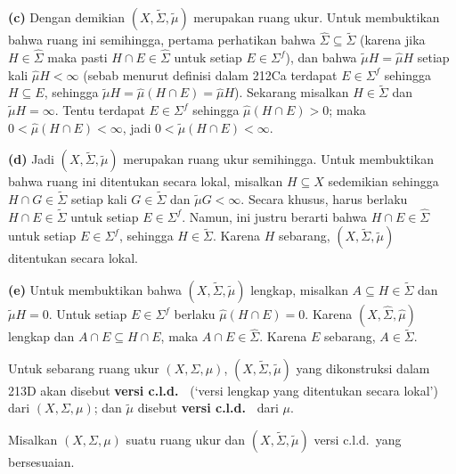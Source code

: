{\medskip

{\bf (c)} Dengan demikian $(X,\tilde\Sigma,\tilde\mu)$ merupakan ruang
ukur.   Untuk membuktikan bahwa ruang ini semihingga, pertama perhatikan bahwa
$\hat\Sigma\subseteq\tilde\Sigma$ (karena jika $H\in\hat\Sigma$ maka
pasti $H\cap E\in\hat\Sigma$ untuk setiap $E\in\Sigma^f$), dan bahwa
$\tilde\mu H=\hat\mu H$ setiap kali $\hat\mu H<\infty$ (sebab menurut
definisi dalam 212Ca terdapat $E\in\Sigma^f$ sehingga
$H\subseteq E$, sehingga
$\tilde\mu H=\hat\mu(H\cap E)=\hat\mu H$).   Sekarang misalkan
$H\in\tilde\Sigma$ dan $\tilde\mu H=\infty$.   Tentu terdapat
$E\in\Sigma^f$ sehingga $\hat\mu(H\cap E)>0$;  maka $0<\hat\mu(H\cap
E)<\infty$, jadi $0<\tilde\mu(H\cap E)<\infty$.

\medskip

{\bf (d)} Jadi $(X,\tilde\Sigma,\tilde\mu)$ merupakan ruang ukur semihingga.
Untuk membuktikan bahwa ruang ini ditentukan secara lokal, misalkan
$H\subseteq X$ sedemikian sehingga
$H\cap G\in\tilde\Sigma$ setiap kali $G\in\tilde\Sigma$ dan
$\tilde\mu G<\infty$.   Secara khusus, harus berlaku
$H\cap E\in\tilde\Sigma$
untuk setiap $E\in\Sigma^f$.   Namun, ini justru berarti bahwa
$H\cap E\in\hat\Sigma$ untuk setiap $E\in\Sigma^f$, sehingga
$H\in\tilde\Sigma$.
Karena $H$ sebarang, $(X,\tilde\Sigma,\tilde\mu)$ ditentukan secara lokal.

\medskip

{\bf (e)} Untuk membuktikan bahwa $(X,\tilde\Sigma,\tilde\mu)$ lengkap,
misalkan $A\subseteq H\in\tilde\Sigma$ dan $\tilde\mu H=0$.
Untuk setiap $E\in\Sigma^f$ berlaku $\hat\mu(H\cap E)=0$.
Karena $(X,\hat\Sigma,\hat\mu)$ lengkap dan
$A\cap E\subseteq H\cap E$, maka $A\cap E\in\hat\Sigma$.   Karena $E$
sebarang, $A\in\tilde\Sigma$.
}%

 Untuk sebarang ruang ukur $(X,\Sigma,\mu)$,
$(X,\tilde\Sigma,\tilde\mu)$ yang dikonstruksi dalam 213D akan disebut
{\bf versi c.l.d.\ } (`versi lengkap yang ditentukan secara lokal') dari
$(X,\Sigma,\mu)$;  dan $\tilde\mu$ disebut {\bf versi c.l.d.\ } dari $\mu$.

 Misalkan $(X,\Sigma,\mu)$ suatu ruang ukur dan
$(X,\tilde\Sigma,\tilde\mu)$ versi c.l.d.\ yang bersesuaian.

